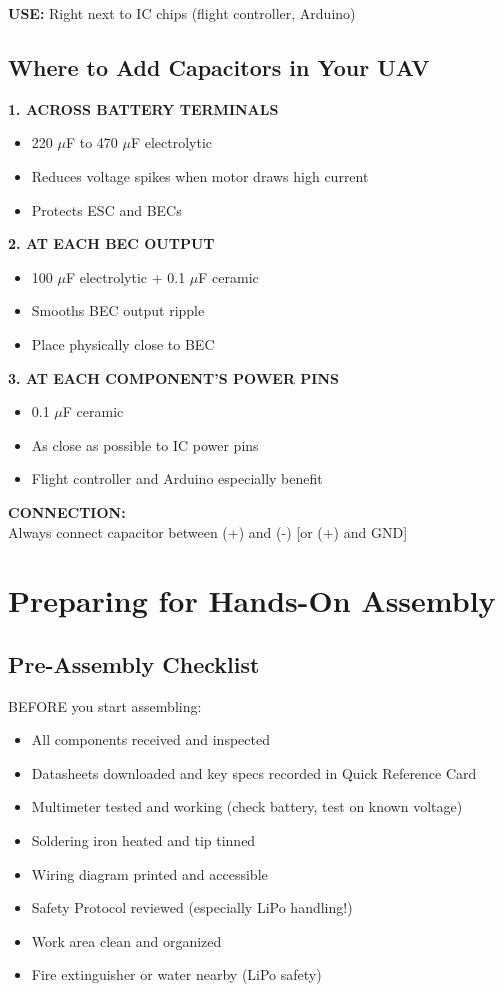 \documentclass[11pt,letterpaper]{article}
\begin{document}
\textbf{USE:} Right next to IC chips (flight controller, Arduino)

\subsection{Where to Add Capacitors in Your UAV}

\textbf{1. ACROSS BATTERY TERMINALS}
\begin{itemize}
\item 220 $\mu$F to 470 $\mu$F electrolytic
\item Reduces voltage spikes when motor draws high current
\item Protects ESC and BECs
\end{itemize}

\textbf{2. AT EACH BEC OUTPUT}
\begin{itemize}
\item 100 $\mu$F electrolytic + 0.1 $\mu$F ceramic
\item Smooths BEC output ripple
\item Place physically close to BEC
\end{itemize}

\textbf{3. AT EACH COMPONENT'S POWER PINS}
\begin{itemize}
\item 0.1 $\mu$F ceramic
\item As close as possible to IC power pins
\item Flight controller and Arduino especially benefit
\end{itemize}

\textbf{CONNECTION:}\\
Always connect capacitor between (+) and (-) [or (+) and GND]

\newpage
\section{Preparing for Hands-On Assembly}

\subsection{Pre-Assembly Checklist}

BEFORE you start assembling:

\begin{itemize}[label=$\square$]
\item All components received and inspected
\item Datasheets downloaded and key specs recorded in Quick Reference Card
\item Multimeter tested and working (check battery, test on known voltage)
\item Soldering iron heated and tip tinned
\item Wiring diagram printed and accessible
\item Safety Protocol reviewed (especially LiPo handling!)
\item Work area clean and organized
\item Fire extinguisher or water nearby (LiPo safety)
\end{itemize}
\end{document}
